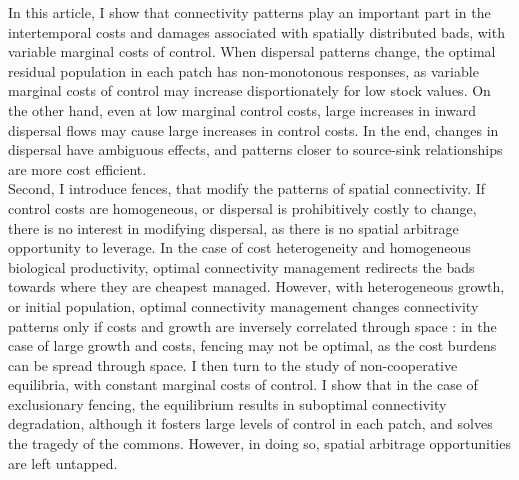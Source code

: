 In this article, I show that connectivity patterns play an important part in the intertemporal costs and damages associated with spatially distributed bads, with variable marginal costs of control. When dispersal patterns change, the optimal residual population in each patch has non-monotonous responses, as variable marginal costs of control may increase disportionately for low stock values. On the other hand, even at low marginal control costs, large increases in inward dispersal flows may cause large increases in control costs. In the end, changes in dispersal have ambiguous effects, and patterns closer to source-sink relationships are more cost efficient. \\
Second, I introduce fences, that modify the patterns of spatial connectivity. If control costs are homogeneous, or dispersal is prohibitively costly to change, there is no interest in modifying dispersal, as there is no spatial arbitrage opportunity to leverage. In the case of cost heterogeneity and homogeneous biological productivity, optimal connectivity management redirects the bads towards where they are cheapest managed. However, with heterogeneous growth, or initial population, optimal connectivity management changes connectivity patterns only if costs and growth are inversely correlated through space : in the case of large growth and costs, fencing may not be optimal, as the cost burdens can be spread through space. I then turn to the study of non-cooperative equilibria, with constant marginal costs of control. I show that in the case of exclusionary fencing, the equilibrium results in suboptimal connectivity degradation, although it fosters large levels of control in each patch, and solves the tragedy of the commons. However, in doing so, spatial arbitrage opportunities are left untapped. 

